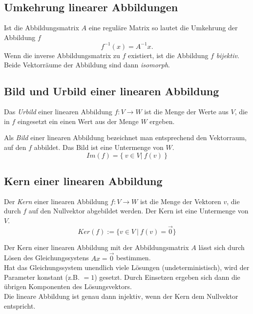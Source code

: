 \subsection{Umkehrung linearer Abbildungen}
\label{sub:umkehrung_linearer_abbildungen}

Ist die Abbildungsmatrix $A$ eine reguläre Matrix so lautet die Umkehrung der Abbildung $f$
\begin{equation}
	f^{-1}(x) = A^{-1}x.
\end{equation}
Wenn die inverse Abbildungsmatrix zu $f$ existiert, ist die Abbildung $f$ \emph{bijektiv}. Beide Vektorräume der 
Abbildung sind dann \emph{isomorph}.

\subsection{Bild und Urbild einer linearen Abbildung}
\label{sub:bild_und_urbild_einer_linearen_abbildung}

Das \emph{Urbild} einer linearen Abbildung $f : V \rightarrow W$ ist die Menge der Werte aus $V$, die in $f$ eingesetzt
ein einen Wert aus der Menge $W$ ergeben.

Als \emph{Bild} einer linearen Abbildung bezeichnet man entsprechend den Vektorraum, auf den $f$ abbildet. 
Das Bild ist eine Untermenge von $W$.
\begin{equation}
	Im(f) = \{ \: v \in V | \: f(v) \:  \}
\end{equation}

\subsection{Kern einer linearen Abbildung} 
\label{sub:kern_einer_linearen_abbildung}

Der \emph{Kern} einer linearen Abbildung $f : V \rightarrow W$ ist die Menge der Vektoren $v$, die durch $f$ auf den 
Nullvektor abgebildet werden. Der Kern ist eine Untermenge von $V$.
\begin{equation}
	Ker(f) := \{v \in V \: | \: f(v) = \overrightarrow{0}\}
\end{equation}

Der Kern einer linearen Abbildung mit der Abbildungsmatrix $A$ lässt sich durch Lösen des 
Gleichungssystens $Ax = \overrightarrow{0}$ bestimmen. \\
Hat das Gleichungssystem unendlich viele Lösungen
(undeterministisch), wird der Parameter konstant (z.B. $=1$) gesetzt. Durch Einsetzen ergeben sich dann die
übrigen Komponenten des Lösungsvektors. \\
Die lineare Abbildung ist genau dann injektiv, wenn der Kern dem Nullvektor entspricht.

